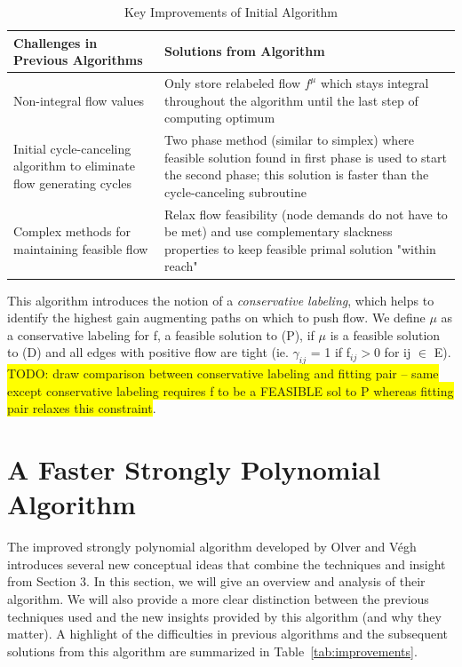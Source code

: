 \documentclass[12pt]{article}
\theoremstyle{definition}
\newcommand{\gij}{\gamma_{ij}}
\newcommand{\todo}[1]{\colorbox{yellow}{TODO: #1}}
\begin{document}
\begin{table}[H]
\begin{center}
    \begin{tabular}{ | p{7cm} | p{7cm} |}
    \hline
    Challenges in Previous Algorithms  & Solutions from Algorithm \\ \hline
    Non-integral flow values & Only store relabeled flow $f^{\mu}$ which stays integral throughout the algorithm until the last step of computing optimum \\ \hline
    Initial cycle-canceling algorithm to eliminate flow generating cycles & Two phase method (similar to simplex) where feasible solution found in first phase is used to start the second phase; this solution is faster than the cycle-canceling subroutine \\ \hline
    Complex methods for maintaining feasible flow & Relax flow feasibility (node demands do not have to be met) and use complementary slackness properties to keep feasible primal solution "within reach" \\
    \hline
    \end{tabular}
\end{center}
\caption{Key Improvements of Initial Algorithm}
\label{tab:improvementsInitial}
\end{table}
This algorithm introduces the notion of a \textit{conservative labeling}, which helps to identify the highest gain augmenting paths on which to push flow. We define $\mu$ as a conservative labeling for f, a feasible solution to (P), if $\mu$ is a feasible solution to (D) and all edges with positive flow are tight (ie. $\gij$ = 1 if f$_{ij} > 0$ for ij $\in$ E). \todo{draw comparison between conservative labeling and fitting pair -- same except conservative labeling requires f to be a FEASIBLE sol to P whereas fitting pair relaxes this constraint}. 
\section{A Faster Strongly Polynomial Algorithm} The improved strongly polynomial algorithm developed by Olver and Végh \cite{Olver2017} introduces several new conceptual ideas that combine the techniques and insight from Section 3. In this section, we will give an overview and analysis of their algorithm. We will also provide a more clear distinction between the previous techniques used and the new insights provided by this algorithm (and why they matter). A highlight of the difficulties in previous algorithms and the subsequent solutions from this algorithm are summarized in Table~\ref{tab:improvements}.
\end{document}
